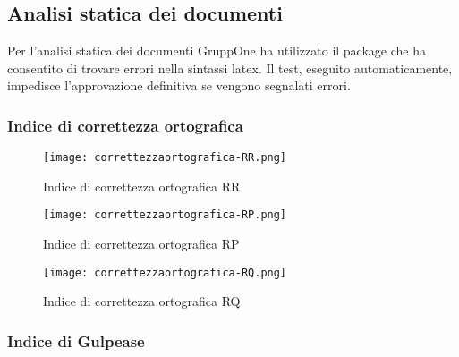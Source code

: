 \documentclass[../piano-di-qualifica.tex]{subfiles}
\begin{document}
\subsection{Analisi statica dei documenti}%
\label{sub:analisi_statica_doc}
Per l'analisi statica dei documenti GruppOne ha utilizzato il package  che ha consentito di trovare errori nella sintassi latex.
Il test, eseguito automaticamente, impedisce l'approvazione definitiva se vengono segnalati errori.

\subsubsection{Indice di correttezza ortografica}%
\label{subs:indice_corr_ortografica}

\begin{figure}[H]
  \centering
  \texttt{[image: correttezzaortografica-RR.png]}%
  \caption{Indice di correttezza ortografica \- RR}%
  \label{fig:indice_correttezza_ortografica_RR}%
\end{figure}


\begin{figure}[H]
  \centering
  \texttt{[image: correttezzaortografica-RP.png]}%
  \caption{Indice di correttezza ortografica \- RP}%
  \label{fig:indice_correttezza_ortografica_RP}%
\end{figure}

\begin{figure}[H]
  \centering
  \texttt{[image: correttezzaortografica-RQ.png]}%
  \caption{Indice di correttezza ortografica \- RQ}%
  \label{fig:indice_correttezza_ortografica_RQ}%
\end{figure}



\subsubsection{Indice di Gulpease}%
\label{subs:indice_gulpease}
\end{document}
